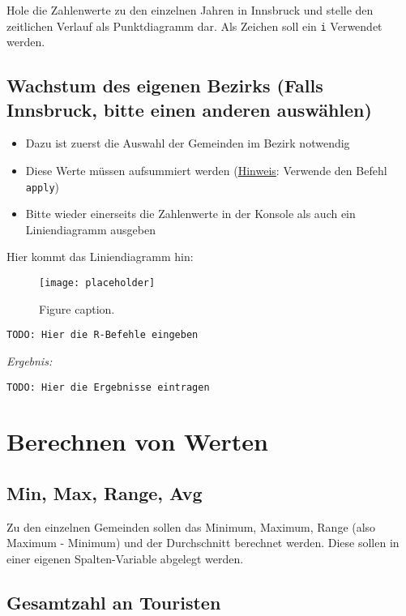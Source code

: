 \documentclass{article}
\begin{document}
Hole die Zahlenwerte zu den einzelnen Jahren in Innsbruck und stelle den zeitlichen Verlauf als Punktdiagramm dar. Als Zeichen soll ein \texttt{i} Verwendet werden.

\subsection{Wachstum des eigenen Bezirks (Falls Innsbruck, bitte einen anderen auswählen)}

\begin{itemize}
	\item Dazu ist zuerst die Auswahl der Gemeinden im Bezirk notwendig
	\item Diese Werte müssen aufsummiert werden (\underline{Hinweis}: Verwende den Befehl \texttt{apply})
	\item Bitte wieder einerseits die Zahlenwerte in der Konsole als auch ein Liniendiagramm ausgeben
\end{itemize}

Hier kommt das Liniendiagramm hin:

\begin{figure}[H]
	\begin{center}
		\texttt{[image: placeholder]} %
		\caption{Figure caption.}
	\end{center}
\end{figure}


\begin{lstlisting}
TODO: Hier die R-Befehle eingeben
\end{lstlisting}

\textit{Ergebnis:}

\begin{verbatim}
TODO: Hier die Ergebnisse eintragen
\end{verbatim}

\section{Berechnen von Werten}


\subsection{Min, Max, Range, Avg}
Zu den einzelnen Gemeinden sollen das Minimum, Maximum, Range (also Maximum - Minimum) und der Durchschnitt berechnet werden. Diese sollen in einer eigenen Spalten-Variable abgelegt werden.

\subsection{Gesamtzahl an Touristen}
\end{document}

